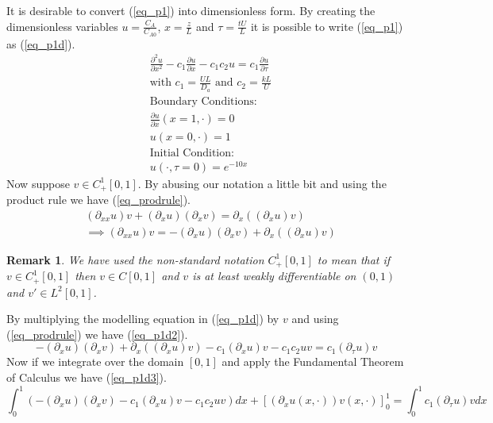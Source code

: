 \documentclass[11pt,fleqn]{article}
\theoremstyle{defstyle}
\newtheorem{rmrk}{Remark}[section]
\begin{document}
It is desirable to convert (\ref{eq_p1}) into dimensionless form. By creating the dimensionless variables $u=\frac{C_A}{C_{A0}}$, $x = \frac{z}{L}$ and $\tau = \frac{tU}{L}$ it is possible to write (\ref{eq_p1}) as (\ref{eq_p1d}).
\begin{equation}
\begin{aligned}
&\frac{\partial^2 u}{\partial x^2} - c_1 \frac{\partial u}{\partial x} - c_1c_2u = 
c_1\frac{\partial u}{\partial \tau} \\
&\text{with } c_1 = \frac{UL}{D_a} \text{ and } c_2 = \frac{kL}{U} \\
&\text{Boundary Conditions:} \\
&\frac{\partial u}{\partial x}(x=1, \cdot) = 0\\
&u(x=0, \cdot) = 1 \\
&\text{Initial Condition:} \\
& u(\cdot, \tau = 0) = e^{-10x}
\end{aligned}
\label{eq_p1d}
\end{equation}
Now suppose $v \in C^1_+[0, 1]$. By abusing our notation a little bit and using the product rule we have (\ref{eq_prodrule}).
\begin{equation}
\begin{aligned}
&(\partial_{xx}u)v + (\partial_xu)(\partial_xv) = \partial_x( (\partial_xu)v)\\
&\implies (\partial_{xx}u)v = -(\partial_xu)(\partial_xv) + \partial_x( (\partial_xu)v)
\end{aligned}
\label{eq_prodrule}
\end{equation}
\begin{rmrk}
We have used the non-standard notation $C^1_+[0, 1]$ to mean that if $v \in C^1_+[0, 1]$ then $v \in C[0, 1]$ and $v$ is at least weakly differentiable on $(0,1)$ and $v\prime \in L^2[0,1]$.
\end{rmrk}
By multiplying the modelling equation in (\ref{eq_p1d}) by $v$ and using (\ref{eq_prodrule}) we have (\ref{eq_p1d2}).
\begin{equation}
 -(\partial_xu)(\partial_xv) + \partial_x( (\partial_xu)v) - c_1(\partial_xu)v - c_1c_2uv = c_1(\partial_{\tau}u)v 
\label{eq_p1d2}
\end{equation}
Now if we integrate over the domain $[0, 1]$ and apply the Fundamental Theorem of Calculus we have (\ref{eq_p1d3}).
\begin{equation}
\int_0^1 (-(\partial_xu)(\partial_xv) - c_1(\partial_xu)v - c_1c_2uv)dx + [(\partial_xu(x, \cdot))v(x, \cdot)]^1_0 = \int^1_0 c_1(\partial_{\tau}u)v dx
\label{eq_p1d3}
\end{equation}
\end{document}
